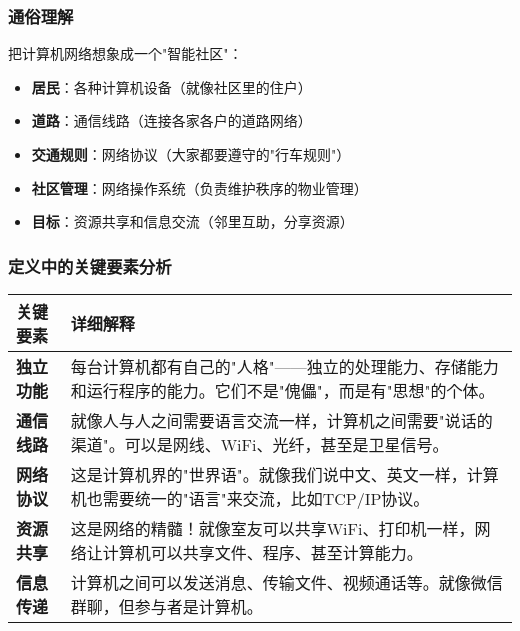 \documentclass[lang=cn,newtx,10pt,scheme=chinese]{../../elegantbook}
\begin{document}
\begin{center}
\end{center}

\subsubsection{通俗理解}
把计算机网络想象成一个"智能社区"：

\begin{itemize}
    \item \textbf{居民}：各种计算机设备（就像社区里的住户）
    \item \textbf{道路}：通信线路（连接各家各户的道路网络）
    \item \textbf{交通规则}：网络协议（大家都要遵守的"行车规则"）
    \item \textbf{社区管理}：网络操作系统（负责维护秩序的物业管理）
    \item \textbf{目标}：资源共享和信息交流（邻里互助，分享资源）
\end{itemize}

\subsubsection{定义中的关键要素分析}

\begin{longtable}{|p{3cm}|p{10cm}|}
\hline
\textbf{关键要素} & \textbf{详细解释} \\
\hline
\textbf{独立功能} & 
每台计算机都有自己的"人格"——独立的处理能力、存储能力和运行程序的能力。它们不是"傀儡"，而是有"思想"的个体。 \\
\hline
\textbf{通信线路} & 
就像人与人之间需要语言交流一样，计算机之间需要"说话的渠道"。可以是网线、WiFi、光纤，甚至是卫星信号。 \\
\hline
\textbf{网络协议} & 
这是计算机界的"世界语"。就像我们说中文、英文一样，计算机也需要统一的"语言"来交流，比如TCP/IP协议。 \\
\hline
\textbf{资源共享} & 
这是网络的精髓！就像室友可以共享WiFi、打印机一样，网络让计算机可以共享文件、程序、甚至计算能力。 \\
\hline
\textbf{信息传递} & 
计算机之间可以发送消息、传输文件、视频通话等。就像微信群聊，但参与者是计算机。 \\
\hline
\end{longtable}
\end{document}
